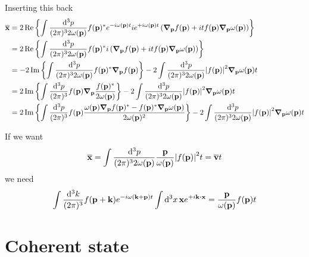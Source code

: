 Inserting this back
\begin{equation}
	\begin{split}
		\overline{\vb{x}}
		&=
		2\operatorname{\operatorname{Re}}\left\{
			\int\frac{\dd[3]{p}}{(2\pi)^32\omega(\vb{p})}
			f(\vb{p})^*
			e^{-i\omega(\vb{p})t}
			ie^{+i\omega(\vb{p})t}
			\left(
				\grad_{\vb{p}}
				f(\vb{p})
				+
				it
				f(\vb{p})
				\grad_{\vb{p}}
				\omega(\vb{p})
			\right)
		\right\}
		\\
		&=
		2\operatorname{\operatorname{Re}}\left\{
			\int\frac{\dd[3]{p}}{(2\pi)^32\omega(\vb{p})}
			f(\vb{p})^*
			i
			\left(
				\grad_{\vb{p}}
				f(\vb{p})
				+
				it
				f(\vb{p})
				\grad_{\vb{p}}
				\omega(\vb{p})
			\right)
		\right\}
		\\
		&=
		-
		2\operatorname{\operatorname{Im}}\left\{
			\int\frac{\dd[3]{p}}{(2\pi)^32\omega(\vb{p})}
			f(\vb{p})^*
			\grad_{\vb{p}}
			f(\vb{p})
		\right\}
		-
		2
		\int\frac{\dd[3]{p}}{(2\pi)^32\omega(\vb{p})}
		\abs{f(\vb{p})}^2
		\grad_{\vb{p}}
		\omega(\vb{p})t
		\\
		&=
		2\operatorname{\operatorname{Im}}\left\{
			\int\frac{\dd[3]{p}}{(2\pi)^3}
			f(\vb{p})
			\grad_{\vb{p}}
			\frac{f(\vb{p})^*}{2\omega(\vb{p})}
		\right\}
		-
		2
		\int\frac{\dd[3]{p}}{(2\pi)^32\omega(\vb{p})}
		\abs{f(\vb{p})}^2
		\grad_{\vb{p}}
		\omega(\vb{p})t
		\\
		&=
		2\operatorname{\operatorname{Im}}\left\{
			\int\frac{\dd[3]{p}}{(2\pi)^3}
			f(\vb{p})
			\frac{
				\omega(\vb{p})
				\grad_{\vb{p}}
				f(\vb{p})^*
				-
				f(\vb{p})^*
				\grad_{\vb{p}}
				\omega(\vb{p})
			}{2\omega(\vb{p})^2}
		\right\}
		-
		2
		\int\frac{\dd[3]{p}}{(2\pi)^32\omega(\vb{p})}
		\abs{f(\vb{p})}^2
		\grad_{\vb{p}}
		\omega(\vb{p})t
	\end{split}
\end{equation}

If we want
\begin{equation}
	\overline{\vb{x}}
	=
	\int\frac{\dd[3]{p}}{(2\pi)^32\omega(\vb{p})}
	\frac{\vb{p}}{\omega(\vb{p})}
	\abs{f(\vb{p})}^2
	t
	=
	\overline{\vb{v}}t
\end{equation}
we need
\begin{equation}
			\int\frac{\dd[3]{k}}{(2\pi)^3}
			f(\vb{p}+\vb{k})
			e^{-i\omega(\vb{k}+\vb{p})t}
			\int\dd[3]{x}
			\vb{x}
			e^{+i\vb{k}\vdot\vb{x}}
			=
			\frac{\vb{p}}{\omega(\vb{p})}f(\vb{p})t	
\end{equation}

\section{Coherent state}

